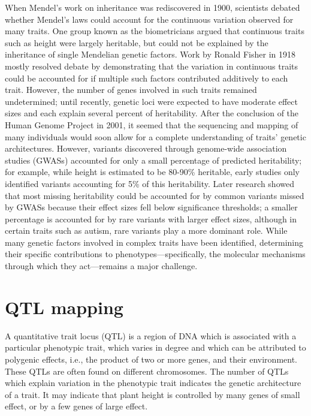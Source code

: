 When Mendel's work on inheritance was rediscovered in 1900, scientists debated whether Mendel's laws could account for the continuous variation observed for many traits. One group known as the biometricians argued that continuous traits such as height were largely heritable, but could not be explained by the inheritance of single Mendelian genetic factors. Work by Ronald Fisher in 1918 mostly resolved debate by demonstrating that the variation in continuous traits could be accounted for if multiple such factors contributed additively to each trait. However, the number of genes involved in such traits remained undetermined; until recently, genetic loci were expected to have moderate effect sizes and each explain several percent of heritability. After the conclusion of the Human Genome Project in 2001, it seemed that the sequencing and mapping of many individuals would soon allow for a complete understanding of traits' genetic architectures. However, variants discovered through genome-wide association studies (GWASs) accounted for only a small percentage of predicted heritability; for example, while height is estimated to be 80-90\% heritable, early studies only identified variants accounting for 5\% of this heritability. Later research showed that most missing heritability could be accounted for by common variants missed by GWASs because their effect sizes fell below significance thresholds; a smaller percentage is accounted for by rare variants with larger effect sizes, although in certain traits such as autism, rare variants play a more dominant role. While many genetic factors involved in complex traits have been identified, determining their specific contributions to phenotypes---specifically, the molecular mechanisms through which they act---remains a major challenge.

\hypertarget{qtl-mapping}{%
\section{QTL mapping}\label{qtl-mapping}}

A quantitative trait locus (QTL) is a region of DNA which is associated with a particular phenotypic trait, which varies in degree and which can be attributed to polygenic effects, i.e., the product of two or more genes, and their environment. These QTLs are often found on different chromosomes. The number of QTLs which explain variation in the phenotypic trait indicates the genetic architecture of a trait. It may indicate that plant height is controlled by many genes of small effect, or by a few genes of large effect.

